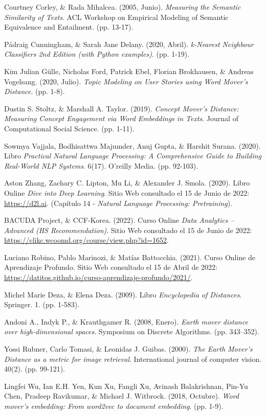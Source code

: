 \documentclass[12pt,a4paper]{article}
\begin{document}
\begin{sloppypar}
\begin{thebibliography}{9}
Courtney Corley, \& Rada Mihalcea. (2005, Junio). \textit{Measuring the Semantic Similarity of Texts}. ACL Workshop on Empirical Modeling of Semantic Equivalence and Entailment. (pp. 13-17).

Pádraig Cunningham, \& Sarah Jane Delany. (2020, Abril). \textit{k-Nearest Neighbour Classifiers 2nd Edition (with Python examples)}. (pp. 1-19).

Kim Julian Gülle, Nicholas Ford, Patrick Ebel, Florian Brokhausen,  \& Andreas Vogelsang. (2020, Julio). \textit{Topic Modeling on User Stories using Word Mover’s Distance}. (pp. 1-8).

Dustin S. Stoltz, \& Marshall A. Taylor. (2019). \textit{Concept Mover’s Distance: Measuring Concept Engagement via Word Embeddings in Texts}. Journal of Computational Social Science. (pp. 1-11).

Sowmya Vajjala, Bodhisattwa Majumder, Anuj Gupta, \& Harshit Surana. (2020). Libro \textit{Practical Natural Language Processing: A Comprehensive Guide to Building Real-World NLP Systems}. 6(17). O'reilly Media. (pp. 92-103).

Aston Zhang, Zachary C. Lipton, Mu Li, \& Alexander J. Smola. (2020). Libro Online \textit{Dive into Deep Learning}. Sitio Web consultado el 15 de Junio de 2022: \url{https://d2l.ai}. (Capítulo 14 - \textit{Natural Language Processing: Pretraining}).

BACUDA Project, \& CCF-Korea. (2022). Curso Online \textit{Data Analytics – Advanced (HS Recommendation)}. Sitio Web consultado el 15 de Junio de 2022: \url{https://clikc.wcoomd.org/course/view.php?id=1652}.

Luciano Robino, Pablo Marinozi, \& Matías Battocchia. (2021). Curso Online de Aprendizaje Profundo. Sitio Web consultado el 15 de Abril de 2022: \url{https://datitos.github.io/curso-aprendizaje-profundo/2021/}.

Michel Marie Deza, \& Elena Deza. (2009). Libro \textit{Encyclopedia of Distances}. Springer. 1. (pp. 1-583).

Andoni A., Indyk P., \& Krauthgamer R. (2008, Enero). \textit{Earth mover distance over high-dimensional spaces}. Symposium on Discrete Algorithms. (pp. 343–352).

Yossi Rubner, Carlo Tomasi, \& Leonidas J. Guibas. (2000). \textit{The Earth Mover’s Distance as a metric for image retrieval}. International journal of computer vision. 40(2). (pp. 99-121).

Lingfei Wu, Ian E.H. Yen, Kun Xu, Fangli Xu, Avinash Balakrishnan, Pin-Yu Chen, Pradeep Ravikumar, \& Michael J. Witbrock. (2018, Octubre). \textit{Word mover’s embedding: From word2vec to document embedding}. (pp. 1-9).

\end{thebibliography}

\end{sloppypar}
\end{document}
